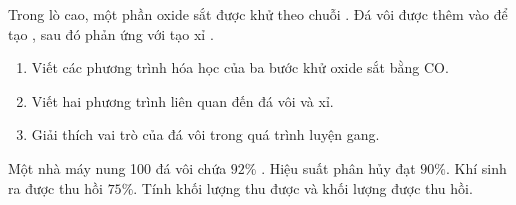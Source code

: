 \begin{tuluyen}
Trong lò cao, một phần oxide sắt được khử theo chuỗi . Đá vôi được thêm vào để tạo , sau đó  phản ứng với  tạo xỉ .
\begin{enumerate}
\item Viết các phương trình hóa học của ba bước khử oxide sắt bằng CO.
\item Viết hai phương trình liên quan đến đá vôi và xỉ.
\item Giải thích vai trò của đá vôi trong quá trình luyện gang.
\end{enumerate}
\end{tuluyen}

\begin{tuluyen}
Một nhà máy nung \SI{100}{\ton} đá vôi chứa $92\%$ . Hiệu suất phân hủy đạt $90\%$. Khí  sinh ra được thu hồi $75\%$. Tính khối lượng  thu được và khối lượng  được thu hồi.
\end{tuluyen}
